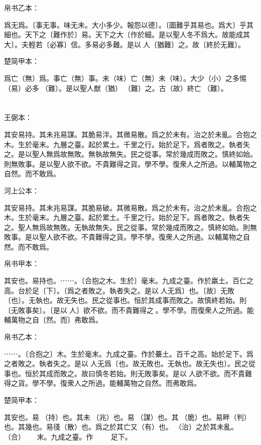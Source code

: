 \documentclass[a5paper]{ctexbook}
\begin{document}
    帛书乙本：

    爲无爲。〔事无事。味无未。大小多少。報怨以德〕。〔圖難乎其易也。爲大〕乎其細也。天下之〔難作於〕易。天下之大〔作於細。是以聖人冬不爲大。故能成其大〕。夫輕若〔必寡〕信。多易必多難。是以𦔻人〔猶難〕之。故〔終於无難〕。

    楚简甲本：

    爲亡（無）爲。事亡（無）事。未（味）亡（無）未（味）。大少（小）之多惕（易）必多󶴱（難）。是以聖人猷（猶）󶴱（難）之。古（故）終亡󶴱（難）。

    \chapter{}
    王弼本：

    其安易持。其未兆易謀。其脆易泮。其微易散。爲之於未有。治之於未亂。合抱之木。生於毫末。九層之臺。起於累土。千里之行。始於足下。爲者敗之。執者失之。是以聖人無爲故無敗。無執故無失。民之從事。常於幾成而敗之。慎終如始。則無敗事。是以聖人欲不欲。不貴難得之貨。學不學。復衆人之所過。以輔萬物之自然。而不敢爲。

    河上公本：

    其安易持。其未兆易謀。其脆易破。其微易散。爲之於未有。治之於未亂。合抱之木。生於毫末。九層之臺。起於累土。千里之行。始於足下。爲者敗之。執者失之。聖人無爲故無敗。无執故無失。民之從事。常於幾成而敗之。慎終如始。則無敗事。是以聖人欲不欲。不貴難得之貨。學不學。復衆人之所過。以輔萬物之自然。而不敢爲。

    帛书甲本：

    其安也。易持也。⋯⋯。〔合抱之木。生於〕毫末。九成之臺。作於羸土。百仁之高。台於足〔下〕。〔爲之者敗之。執者失之。是以𦔻人无爲〕也。〔故〕无敗〔也〕。无執也。故无失也。民之從事也。恒於其成事而敗之。故慎終若始。則〔无敗事矣〕。〔是以𦔻人〕欲不欲。而不貴難得之𦠽。學不學。而復衆人之所過。能輔萬物之自〔然。而〕弗敢爲。

    帛书乙本：

    ⋯⋯。〔合抱之〕木。生於毫末。九成之臺。作於虆土。百千之高。始於足下。爲之者敗之。執者失之。是以𦔻人无爲〔也。故无敗也。无執也。故无失也〕。民之從事也。恒於其成而敗之。故曰慎冬若始。則无敗事矣。是以𦔻人欲不欲。而不貴難得之貨。學不學。復衆人之所過。能輔萬物之自然。而弗敢爲。

    楚简甲本：

    其安也。易𣏔（持）也。其未󶵆（兆）也。易𢘃（謀）也。其󶵇（脆）也。易畔（判）也。其幾也。易㣤（散）也。爲之於其亡又（有）也。𥿆（治）之於其未亂。𣌭（合）☐☐☐☐☐☐末。九成之臺。作☐☐☐☐☐☐☐☐☐足下。
\end{document}
